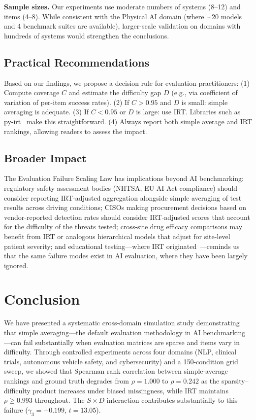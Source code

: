 \documentclass[11pt,a4paper]{article}
\begin{document}
\textbf{Sample sizes.} Our experiments use moderate numbers of systems (8--12) and items (4--8). While consistent with the Physical AI domain (where $\sim$20 models and 4 benchmark suites are available), larger-scale validation on domains with hundreds of systems would strengthen the conclusions.

\subsection{Practical Recommendations}

Based on our findings, we propose a decision rule for evaluation practitioners: (1) Compute coverage $C$ and estimate the difficulty gap $D$ (e.g., via coefficient of variation of per-item success rates). (2) If $C > 0.95$ and $D$ is small: simple averaging is adequate. (3) If $C < 0.95$ or $D$ is large: use IRT. Libraries such as py-irt~\cite{lalor2022} make this straightforward. (4) Always report both simple average and IRT rankings, allowing readers to assess the impact.

\subsection{Broader Impact}

The Evaluation Failure Scaling Law has implications beyond AI benchmarking: regulatory safety assessment bodies (NHTSA, EU AI Act compliance) should consider reporting IRT-adjusted aggregation alongside simple averaging of test results across driving conditions; CISOs making procurement decisions based on vendor-reported detection rates should consider IRT-adjusted scores that account for the difficulty of the threats tested; cross-site drug efficacy comparisons may benefit from IRT or analogous hierarchical models that adjust for site-level patient severity; and educational testing---where IRT originated~\cite{lord1968}---reminds us that the same failure modes exist in AI evaluation, where they have been largely ignored.

\section{Conclusion}

We have presented a systematic cross-domain simulation study demonstrating that simple averaging---the default evaluation methodology in AI benchmarking---can fail substantially when evaluation matrices are sparse and items vary in difficulty. Through controlled experiments across four domains (NLP, clinical trials, autonomous vehicle safety, and cybersecurity) and a 150-condition grid sweep, we showed that Spearman rank correlation between simple-average rankings and ground truth degrades from $\rho = 1.000$ to $\rho = 0.242$ as the sparsity--difficulty product increases under biased missingness, while IRT maintains $\rho \geq 0.993$ throughout. The $S \times D$ interaction contributes substantially to this failure ($\gamma_3 = +0.199$, $t = 13.05$).
\end{document}
